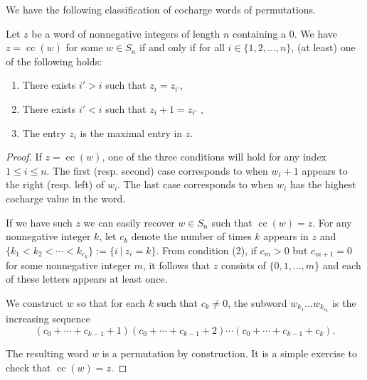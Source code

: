 \documentclass[ALCO, Unicode]{cedram}
\DeclareMathOperator{\cc}{cc}
\begin{document}
We have the following classification of cocharge words of permutations.

\begin{prop}\label{prop: classification of cocharge words}
        Let $z$ be a word of nonnegative integers of length $n$ containing a 0.
        We have $z = \cc(w)$ for some $w\in S_n$ if and only if for all $i\in \{1,2,\dots,  n\}$, (at least) one of the following holds:
    \begin{enumerate}
        \item There exists $i'>i $ such that  $z_i =  z_{i'}$,
        \item There exists $i'<i $ such that  $z_i  + 1=  z_{i'}$ ,
         \item The entry $z_i$ is the maximal entry in $z$.
    \end{enumerate}

\end{prop}

\begin{proof}
    If $z = \cc(w)$, one of the three conditions will hold for any index $1\leq i \leq n$.
    The first (resp. second) case corresponds to when $w_i + 1$ appears to the right (resp. left) of $w_i$. 
   The last case corresponds to when $w_i$ has the highest cocharge value in the word.
   
   If we have such $z$ we can easily recover $w\in S_n$ such that $\cc(w) = z$. 
    For any nonnegative integer $k$, let $c_k$ denote the number of times $k$ appears in $z$ and $\{k_1<k_2<\cdots<k_{c_k}\} := \{i \ | \ z_i = k\}$. From condition (2), if $c_m >0$ but $c_{m+1} = 0$ for some nonnegative integer $m$, it follows that $z$ consists of $\{0,1,\dots, m\}$ and each of these letters appears at least once.

    We construct $w$ so that for each $k$ such that $c_k\neq 0$, the subword $w_{k_1}\dots w_{k_{c_k}}$ is the increasing sequence \[(c_0+\cdots+ c_{k-1} + 1)(c_0+\cdots+ c_{k-1} + 2)\cdots (c_0+\cdots+ c_{k-1} + c_k).\] 
    
    The resulting word $w$ is a permutation by construction. It is a simple exercise to check that $\cc(w) = z$.
    \end{proof}
\end{document}
